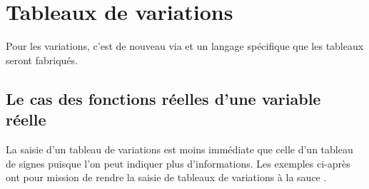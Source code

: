 \documentclass[10pt, a4paper]{tutodoc}
\begin{document}
\section{Tableaux de variations}

\begin{tdocnote}
	Pour les variations, c'est de nouveau via  et un langage spécifique que les tableaux seront fabriqués.
\end{tdocnote}




\subsection{Le cas des fonctions réelles d'une variable réelle}

La saisie d'un tableau de variations est moins immédiate que celle d'un tableau de signes puisque l'on peut indiquer plus d'informations. Les exemples ci-après ont pour mission de rendre  la saisie de tableaux de variations à la sauce \thispack.
\end{document}
